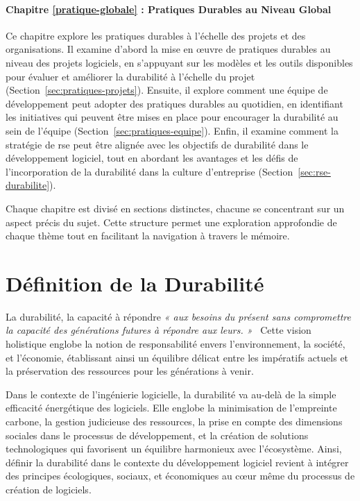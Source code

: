\paragraph{Chapitre \ref{pratique-globale} : Pratiques Durables au Niveau Global}
Ce chapitre explore les pratiques durables à l'échelle des projets et des organisations. Il examine d'abord la mise en œuvre de pratiques durables au niveau des projets logiciels, en s'appuyant sur les modèles et les outils disponibles pour évaluer et améliorer la durabilité à l'échelle du projet (Section~\ref{sec:pratiques-projets}). Ensuite, il explore comment une équipe de développement peut adopter des pratiques durables au quotidien, en identifiant les initiatives qui peuvent être mises en place pour encourager la durabilité au sein de l'équipe (Section~\ref{sec:pratiques-equipe}). Enfin, il examine comment la stratégie de \acrshort{rse} peut être alignée avec les objectifs de durabilité dans le développement logiciel, tout en abordant les avantages et les défis de l'incorporation de la durabilité dans la culture d'entreprise (Section~\ref{sec:rse-durabilite}).


Chaque chapitre est divisé en sections distinctes, chacune se concentrant sur un aspect précis du sujet. Cette structure permet une exploration approfondie de chaque thème tout en facilitant la navigation à travers le mémoire.

\section{Définition de la Durabilité}
La durabilité, la capacité à répondre \emph{« aux besoins du présent sans compromettre la capacité des générations futures à répondre aux leurs. »}~\cite{Brundtland87} 
Cette vision holistique englobe la notion de responsabilité envers l'environnement, la société, et l'économie, établissant ainsi un équilibre délicat entre les impératifs actuels et la préservation des ressources pour les générations à venir.


Dans le contexte de l'ingénierie logicielle, la durabilité va au-delà de la simple efficacité énergétique des logiciels. Elle englobe la minimisation de l'empreinte carbone, la gestion judicieuse des ressources, la prise en compte des dimensions sociales dans le processus de développement, et la création de solutions technologiques qui favorisent un équilibre harmonieux avec l'écosystème. Ainsi, définir la durabilité dans le contexte du développement logiciel revient à intégrer des principes écologiques, sociaux, et économiques au cœur même du processus de création de logiciels.


